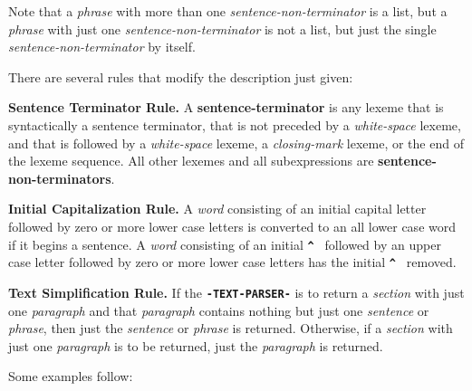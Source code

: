 \documentclass[12pt]{article}
\newcommand{\TT}[1]{{\tt \bfseries #1}}
\newcommand{\key}[1]{{\rm \bfseries #1}}
\newcommand{\ttkey}[1]{{\tt \bfseries #1}}
\begin{document}
Note that a {\em phrase} with more than one {\em sentence-non-terminator}
is a list, but a {\em phrase} with just one {\em sentence-non-terminator}
is not a list, but just the single {\em sentence-non-terminator} by itself.

There are several rules that modify the description just given:

{\bf Sentence Terminator Rule.}
A \key{sentence-terminator} is any lexeme that is syntactically
a sentence terminator, that is not preceded by a {\em white-space}
lexeme, and that is followed by a {\em white-space} lexeme, a
{\em closing-mark} lexeme, or the
end of the lexeme sequence.  All other lexemes and all subexpressions are
\key{sentence-non-terminators}.

{\bf Initial Capitalization Rule.}
A {\em word} consisting of an initial capital letter followed
by zero or more lower case letters is converted
to an all lower case word if it begins a sentence.
A {\em word} consisting of an initial
\ttkey{\^~} followed by an upper
case letter followed by zero or more lower case letters has the
initial \TT{\^~} removed.

{\bf Text Simplification Rule.}
If the \TT{-TEXT-PARSER-} is to return a {\em section} with just
one {\em paragraph} and that {\em paragraph} contains nothing but
just one {\em sentence} or {\em phrase},
then just the {\em sentence} or {\em phrase} is returned.
Otherwise, if a {\em section} with just one {\em paragraph} is
to be returned, just the {\em paragraph} is returned.


Some examples follow:
\end{document}

